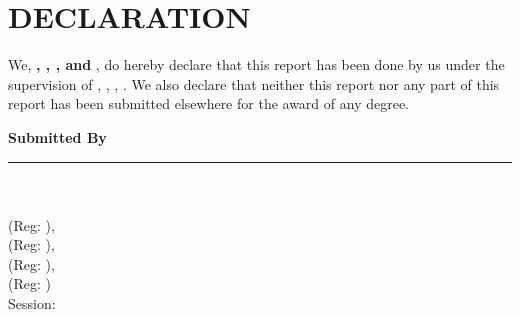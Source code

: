 \chapter*{DECLARATION}
\thispagestyle{empty}

We, \textbf{\studentonename, \studenttwoname, \studentthreename, and \studentfourname}, do hereby declare that this report has been done by us under the supervision of \textbf{\supervisorname}, \supervisortitle, \supervisordept, \uniname. We also declare that neither this report nor any part of this report has been submitted elsewhere for the award of any degree.

\vspace{1.5cm}
\noindent\textbf{Submitted By}

\vspace{0.6cm}
\noindent\rule{6cm}{0.4pt}\\
\textbf{\teamname}\\
\studentonename (Reg: \studentonereg),\\
\studenttwoname (Reg: \studenttworeg),\\
\studentthreename (Reg: \studentthreereg),\\
\studentfourname (Reg: \studentfourreg)\\
Session: \session\\
\deptname\\
\uniname
